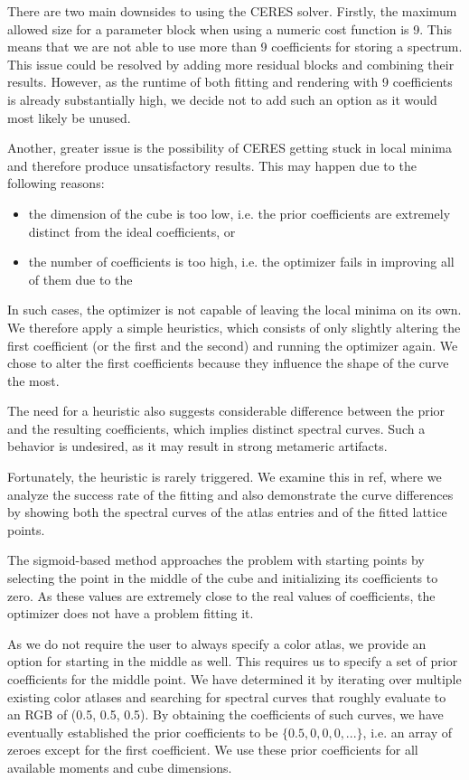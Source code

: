 There are two main downsides to using the CERES solver. Firstly, the maximum allowed size for a parameter block when using a numeric cost function is 9. This means that we are not able to use more than 9 coefficients for storing a spectrum. This issue could be resolved by adding more residual blocks and combining their results. However, as the runtime of both fitting and rendering with 9 coefficients is already substantially high, we decide not to add such an option as it would most likely be unused.

Another, greater issue is the possibility of CERES getting stuck in local minima and therefore produce unsatisfactory results. This may happen due to the following reasons:
\begin{itemize} \label{ceresDeficiency}
	\item the dimension of the cube is too low, i.e. the prior coefficients are extremely distinct from the ideal coefficients, or
	\item the number of coefficients is too high, i.e. the optimizer fails in improving all of them due to the 
\end{itemize}
In such cases, the optimizer is not capable of leaving the local minima on its own. We therefore apply a simple heuristics, which consists of only slightly altering the first coefficient (or the first and the second) and running the optimizer again. We chose to alter the first coefficients because they influence the shape of the curve the most.

The need for a heuristic also suggests considerable difference between the prior and the resulting coefficients, which implies distinct spectral curves. Such a behavior is undesired, as it may result in strong metameric artifacts.

Fortunately, the heuristic is rarely triggered. We examine this in ref, where we analyze the success rate of the fitting and also demonstrate the curve differences by showing both the spectral curves of the atlas entries and of the fitted lattice points.

The sigmoid-based method approaches the problem with starting points by selecting the point in the middle of the cube and initializing its coefficients to zero. As these values are extremely close to the real values of coefficients, the optimizer does not have a problem fitting it.

As we do not require the user to always specify a color atlas, we provide an option for starting in the middle as well. This requires us to specify a set of prior coefficients for the middle point. We have determined it by iterating over multiple existing color atlases and searching for spectral curves that roughly evaluate to an RGB of (0.5, 0.5, 0.5). By obtaining the coefficients of such curves, we have eventually established the prior coefficients to be $\{0.5, 0, 0, 0, ... \}$, i.e. an array of zeroes except for the first coefficient. We use these prior coefficients for all available moments and cube dimensions.

